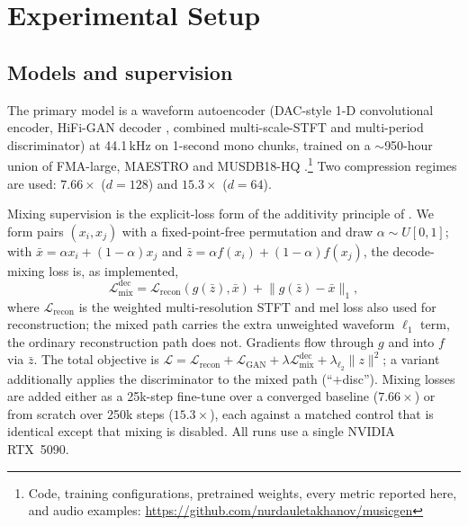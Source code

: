 \documentclass[conference]{IEEEtran}
\newcommand{\Ldec}{\mathcal{L}_\mathrm{mix}^\mathrm{dec}}
\begin{document}
\section{Experimental Setup}\label{sec:setup}

\subsection{Models and supervision}\label{sec:models}
The primary model is a waveform autoencoder (DAC-style 1-D convolutional
encoder, HiFi-GAN decoder \cite{kong2020hifigan}, combined multi-scale-STFT
and multi-period discriminator) at 44.1\,kHz on 1-second mono chunks, trained
on a ${\sim}$950-hour union of FMA-large, MAESTRO and MUSDB18-HQ
\cite{rafii2017musdb18}.\footnote{Code, training configurations, pretrained
weights, every metric reported here, and audio examples:
\url{https://github.com/nurdauletakhanov/musicgen}} Two compression regimes
are used: $7.66\times$ ($d{=}128$) and $15.3\times$ ($d{=}64$).

Mixing supervision is the explicit-loss form of the additivity principle of
\cite{torres2026linearity}. We form pairs $(x_i,x_j)$ with a fixed-point-free permutation and draw
$\alpha\sim U[0,1]$; with
$\bar{x}=\alpha x_i{+}(1{-}\alpha)x_j$ and
$\bar{z}=\alpha f(x_i){+}(1{-}\alpha)f(x_j)$, the decode-mixing loss is, as
implemented,
\begin{equation}
  \Ldec=\mathcal{L}_\mathrm{recon}\!\left(g(\bar{z}),\bar{x}\right)
        +\lVert g(\bar{z})-\bar{x}\rVert_1 ,
  \label{eq:ldec}
\end{equation}
where $\mathcal{L}_\mathrm{recon}$ is the weighted multi-resolution STFT and
mel loss also used for reconstruction; the mixed path carries the extra
unweighted waveform $\ell_1$ term, the ordinary reconstruction path does not.
Gradients flow through $g$ and into $f$ via $\bar{z}$. The total objective
is
$\mathcal{L}=\mathcal{L}_\mathrm{recon}+\mathcal{L}_\mathrm{GAN}+\lambda\Ldec
+\lambda_{\ell_2}\lVert z\rVert^2$; a variant additionally applies the
discriminator to the mixed path (``$+$disc''). Mixing losses are added either
as a 25k-step fine-tune over a converged baseline ($7.66\times$) or from
scratch over 250k steps ($15.3\times$), each against a matched control that is
identical except that mixing is disabled. All runs use a single NVIDIA
RTX~5090.
\end{document}
